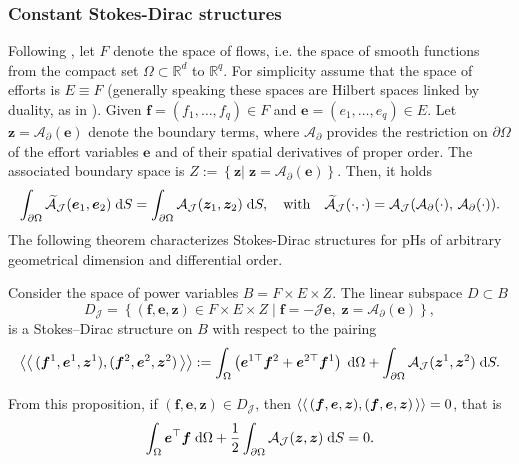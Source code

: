 \subsubsection{Constant Stokes-Dirac structures}
Following \cite{macchelli2004modelling}, let ${F}$ denote the space of flows, i.e. the space of smooth functions from the compact set $\Omega \subset \mathbb{R}^d$ to $\mathbb{R}^q$. For simplicity assume that  the space of efforts is ${E} \equiv {F}$ (generally speaking these spaces are Hilbert spaces linked by duality, as in \cite{villegas2007}). Given $\bm{f} = (f_1, \dots, f_q) \in {F}$ and $\bm{e} = (e_1, \dots, e_q) \in {E}$. Let $\bm{z} = \mathcal{A}_\partial(\bm{e})$ denote the boundary terms, where $\mathcal{A}_\partial$ provides the restriction on $\partial\Omega$ of the effort variables $\bm{e}$ and of their spatial derivatives of proper order. The associated boundary space is ${Z} := \left\{ \bm{z} \vert \; \bm{z} = \mathcal{A}_{\partial}(\bm{e})  \right\}$. Then, it holds
\begin{equation}
\int_{\partial \Omega} \widetilde{\mathcal{A}}_{\mathcal{J}}(\bm{e}_1, \bm{e}_2) \d{S} = \int_{\partial \Omega} \mathcal{A}_{\mathcal{J}}(\bm{z}_1, \bm{z}_2) \d{S}, \quad \text{with} \quad  \widetilde{\mathcal{A}}_\mathcal{J}(\cdot, \cdot) = \mathcal{A}_{\mathcal{J}}(\mathcal{A}_{\partial}(\cdot), \, \mathcal{A}_{\partial}(\cdot)).
\end{equation}
The following theorem characterizes Stokes-Dirac structures for pHs of arbitrary geometrical dimension and differential order.
\begin{proposition}
	\label{prop:StokesDirac}
	
	Consider the space of power variables ${B} = {F} \times {E} \times {Z}$. The linear subspace ${D} \subset {B}$
	\begin{equation}
	{D}_{\mathcal{J}} = \left\{ (\bm{f}, \bm{e}, \bm{z}) \in  {F} \times {E} \times {Z} \; \vert \; \bm{f} = -\mathcal{J} \bm{e}, \; \bm{z} = \mathcal{A}_\partial(\bm{e}) \right\},
	\end{equation}
	is a Stokes–Dirac structure on $B$ with respect to the pairing
	\begin{equation}
	\bilprod{(\bm{f}^1, \bm{e}^1, \bm{z}^1)}{(\bm{f}^2, \bm{e}^2, \bm{z}^2)}  := \int_{\Omega} \left( \bm{e}^{1 \top} \bm{f}^ 2 + \bm{e}^{2 \top} \bm{f}^1 \right) \d\Omega + \int_{\partial \Omega} \mathcal{A}_{\mathcal{J}}(\bm{z}^1, \bm{z}^2) \d{S}.
	\end{equation}
\end{proposition}
From this proposition, if $(\bm{f}, \bm{e}, \bm{z}) \in  D_{\mathcal{J}}$, then $\left\langle \left\langle \, (\bm{f}, \bm{e}, \bm{z}), (\bm{f}, \bm{e}, \bm{z}) \, \right\rangle \right\rangle=0$, that is
\begin{equation}\label{eq:enbalstr}
\int_{\Omega} \bm{e}^\top \bm{f}  \d\Omega + \frac{1}{2} \int_{\partial \Omega} \mathcal{A}_{\mathcal{J}}(\bm{z}, \bm{z}) \d{S} = 0.
\end{equation}


